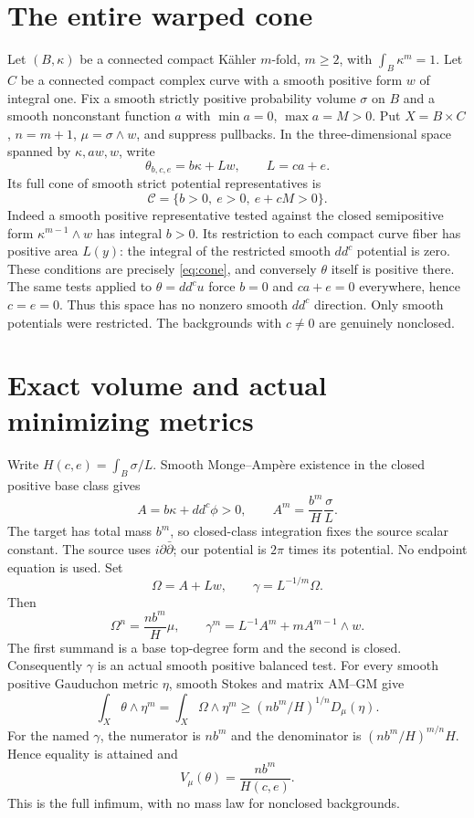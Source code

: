 \documentclass[11pt]{article}
\newcommand{\ddc}{dd^c}
\theoremstyle{remark}\newtheorem{remark}[theorem]{Remark}
\begin{document}
\section{The entire warped cone}
Let $(B,\kappa)$ be a connected compact K\"ahler $m$-fold, $m\geq2$, with
$\int_B\kappa^m=1$. Let $C$ be a connected compact complex curve with
a smooth positive form $w$ of integral one. Fix a smooth strictly positive
probability volume $\sigma$ on $B$ and a smooth nonconstant function $a$
with $\min a=0$, $\max a=M>0$. Put $X=B\times C$, $n=m+1$,
$\mu=\sigma\wedge w$, and suppress pullbacks. In the three-dimensional
space spanned by $\kappa,aw,w$, write
\[
 \theta_{b,c,e}=b\kappa+Lw,\qquad L=ca+e.
\]
Its full cone of smooth strict potential representatives is
\begin{equation}\label{eq:cone}
 \mathcal C=\{b>0,\ e>0,\ e+cM>0\}.
\end{equation}
Indeed a smooth positive representative tested against the closed
semipositive form $\kappa^{m-1}\wedge w$ has integral $b>0$.
Its restriction to each compact curve fiber has positive area $L(y)$:
the integral of the restricted smooth $\ddc$ potential is zero. These
conditions are precisely \eqref{eq:cone}, and conversely $\theta$ itself
is positive there. The same tests applied to $\theta=\ddc u$ force
$b=0$ and $ca+e=0$ everywhere, hence $c=e=0$. Thus this space has no
nonzero smooth $\ddc$ direction. Only smooth potentials were restricted.
The backgrounds with $c\ne0$ are genuinely nonclosed.

\section{Exact volume and actual minimizing metrics}
Write $H(c,e)=\int_B\sigma/L$. Smooth Monge--Amp\`ere existence in the
closed positive base class \cite[Corollary 1]{TW} gives
\[
 A=b\kappa+\ddc\phi>0,\qquad A^m=\frac{b^m}{H}\frac{\sigma}{L}.
\]
The target has total mass $b^m$, so closed-class integration fixes the
source scalar constant. The source uses $i\partial\bar\partial$;
our potential is $2\pi$ times its potential. No endpoint equation is used.
Set
\[
 \Omega=A+Lw,\qquad\gamma=L^{-1/m}\Omega.
\]
Then
\begin{equation}\label{eq:cofactor}
 \Omega^n=\frac{nb^m}{H}\mu,
 \qquad\gamma^m=L^{-1}A^m+mA^{m-1}\wedge w.
\end{equation}
The first summand is a base top-degree form and the second is closed.
Consequently $\gamma$ is an actual smooth positive balanced test.
For every smooth positive Gauduchon metric $\eta$, smooth Stokes and
matrix AM--GM give
\[
 \int_X\theta\wedge\eta^m=\int_X\Omega\wedge\eta^m
 \geq(nb^m/H)^{1/n}D_\mu(\eta).
\]
For the named $\gamma$, the numerator is $nb^m$ and the denominator is
$(nb^m/H)^{m/n}H$. Hence equality is attained and
\begin{equation}\label{eq:volume}
 V_\mu(\theta)=\frac{nb^m}{H(c,e)}.
\end{equation}
This is the full infimum, with no mass law for nonclosed backgrounds.
\end{document}
